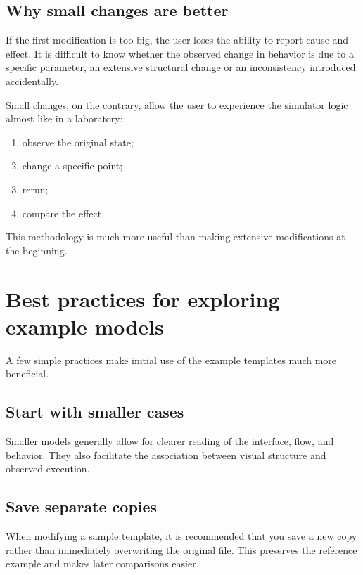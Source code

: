\subsection{Why small changes are better}
\label{subsec:cap4_por_que_pequenas_mudancas}

If the first modification is too big, the user loses the ability to report cause and effect. It is difficult to know whether the observed change in behavior is due to a specific parameter, an extensive structural change or an inconsistency introduced accidentally.

Small changes, on the contrary, allow the user to experience the simulator logic almost like in a laboratory:
\begin{enumerate}
\item observe the original state;
\item change a specific point;
\item rerun;
\item compare the effect.
\end{enumerate}

This methodology is much more useful than making extensive modifications at the beginning.

\section{Best practices for exploring example models}
\label{sec:cap4_boas_praticas_explorar_modelos}

A few simple practices make initial use of the example templates much more beneficial.

\subsection{Start with smaller cases}
\label{subsec:cap4_comece_por_casos_menores}

Smaller models generally allow for clearer reading of the interface, flow, and behavior. They also facilitate the association between visual structure and observed execution.

\subsection{Save separate copies}
\label{subsec:cap4_salve_copias_separadas}

When modifying a sample template, it is recommended that you save a new copy rather than immediately overwriting the original file. This preserves the reference example and makes later comparisons easier.

